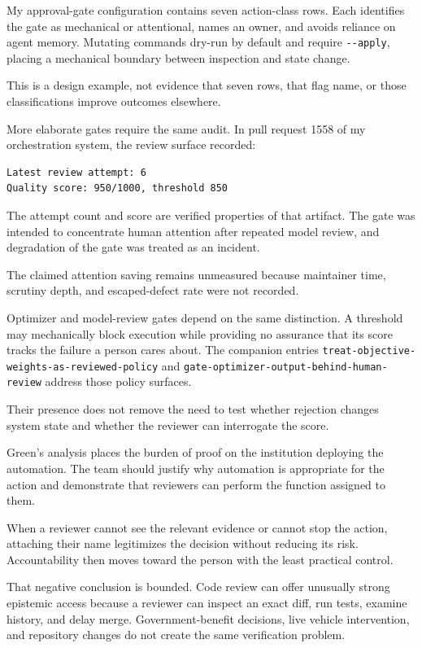 My approval-gate configuration contains seven action-class rows. Each identifies the gate as mechanical or attentional, names an owner, and avoids reliance on agent memory. Mutating commands dry-run by default and require \texttt{-\/-apply}, placing a mechanical boundary between inspection and state change.

This is a design example, not evidence that seven rows, that flag name, or those classifications improve outcomes elsewhere.

More elaborate gates require the same audit. In pull request 1558 of my orchestration system, the review surface recorded:

\begin{verbatim}
Latest review attempt: 6
Quality score: 950/1000, threshold 850
\end{verbatim}

The attempt count and score are verified properties of that artifact. The gate was intended to concentrate human attention after repeated model review, and degradation of the gate was treated as an incident.

The claimed attention saving remains unmeasured because maintainer time, scrutiny depth, and escaped-defect rate were not recorded.

Optimizer and model-review gates depend on the same distinction. A threshold may mechanically block execution while providing no assurance that its score tracks the failure a person cares about. The companion entries \texttt{treat-objective-weights-as-reviewed-policy} and \texttt{gate-optimizer-output-behind-human-review} address those policy surfaces.

Their presence does not remove the need to test whether rejection changes system state and whether the reviewer can interrogate the score.

Green's analysis places the burden of proof on the institution deploying the automation. The team should justify why automation is appropriate for the action and demonstrate that reviewers can perform the function assigned to them.

When a reviewer cannot see the relevant evidence or cannot stop the action, attaching their name legitimizes the decision without reducing its risk. Accountability then moves toward the person with the least practical control.

That negative conclusion is bounded. Code review can offer unusually strong epistemic access because a reviewer can inspect an exact diff, run tests, examine history, and delay merge. Government-benefit decisions, live vehicle intervention, and repository changes do not create the same verification problem.

